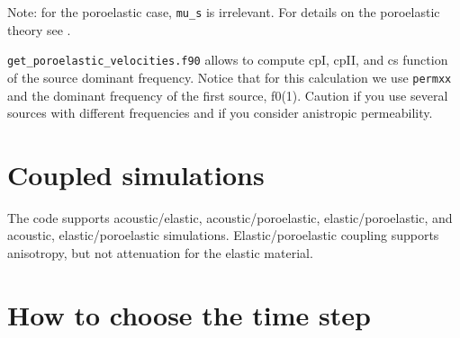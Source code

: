 \documentclass[oneside,english,onecolumn,letterpaper]{book}
\begin{document}
\begin{description}[style=nextline, labelindent=1em, font=\normalfont]
Note: for the poroelastic case, \texttt{mu\_s} is irrelevant.
For details on the poroelastic theory see \cite{MoTr08}.

\end{description}

\texttt{get\_poroelastic\_velocities.f90} allows to compute cpI, cpII, and cs function of
the source dominant frequency. Notice that for this calculation we use \texttt{permxx}
and the dominant frequency of the first source, f0(1). Caution if you use
several sources with different frequencies and if you consider anistropic
permeability.

\section{Coupled simulations}

The code supports acoustic/elastic, acoustic/poroelastic, elastic/poroelastic,
and acoustic, elastic/poroelastic simulations.
Elastic/poroelastic coupling supports anisotropy, but not attenuation for the
elastic material.


\section{How to choose the time step}
\end{document}
